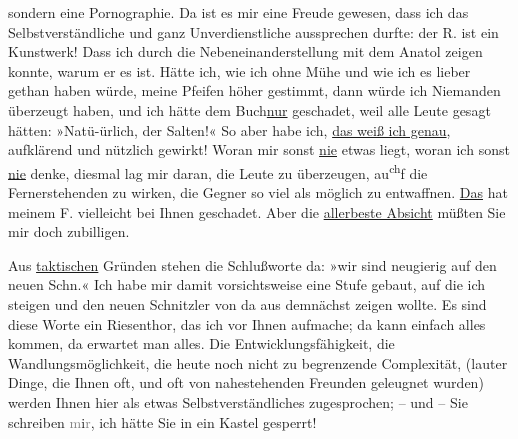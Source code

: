                sondern eine Pornographie. Da ist es mir eine Freude gewesen, dass ich das
               Selbstverständliche und ganz Unverdienstliche aussprechen durfte: der R. ist ein Kunstwerk! Dass ich durch die
               Nebeneinanderstellung mit dem Anatol zeigen
               konnte, warum er es ist. Hätte ich, wie ich ohne Mühe und wie ich es lieber gethan
               haben würde, meine Pfeifen höher gestimmt, dann würde ich Niemanden überzeugt haben,
               und ich hätte dem Buch\uline{nur} geschadet, weil alle Leute gesagt hätten:
               »Natü-ürlich, der Salten!« So aber habe ich, \uline{das weiß ich
                  genau}, aufklärend und nützlich gewirkt! Woran mir sonst \uline{nie} etwas liegt, woran ich sonst \uline{nie}
               denke, diesmal lag mir daran, die Leute zu überzeugen, au\substVorne{}\textsuperscript{ch}\substDazwischen{}f\substHinten{} die Fernerstehenden zu wirken, die Gegner so viel als möglich zu entwaffnen.
                  \uline{Das} hat meinem F. vielleicht bei Ihnen geschadet. Aber die \uline{allerbeste Absicht} müßten Sie mir doch zubilligen.\pend
           
\pstart
           Aus \uline{taktischen} Gründen stehen die Schlußworte da:
                  »wir sind neugierig auf den
                  neuen Schn.« Ich habe mir damit vorsichtsweise eine Stufe gebaut, auf die ich
               steigen und den neuen Schnitzler von da aus demnächst zeigen wollte. Es sind diese
               Worte ein Riesenthor, das ich vor Ihnen aufmache; da kann einfach alles kommen, da
               erwartet man alles. Die Entwicklungsfähigkeit, die Wandlungsmöglichkeit, die heute
               noch nicht zu begrenzende Complexität, (lauter Dinge, die Ihnen oft, und oft von
               nahestehenden Freunden geleugnet wurden) werden Ihnen hier als etwas
               Selbstverständliches zugesprochen; – und – Sie schreiben
                  \textcolor{gray}{m}i\textcolor{gray}{r}, ich hätte Sie in ein Kastel
               gesperrt!\pend
           
